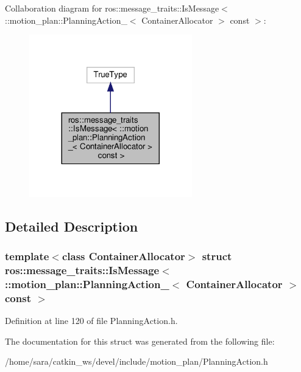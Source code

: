 Collaboration diagram for ros\+:\+:message\+\_\+traits\+:\+:Is\+Message$<$ \+:\+:motion\+\_\+plan\+:\+:Planning\+Action\+\_\+$<$ Container\+Allocator $>$ const $>$\+:
\nopagebreak
\begin{figure}[H]
\begin{center}
\leavevmode
\includegraphics[width=200pt]{structros_1_1message__traits_1_1IsMessage_3_01_1_1motion__plan_1_1PlanningAction___3_01Containerf6746e629c1b3909d4a386f97488adbc}
\end{center}
\end{figure}


\subsection{Detailed Description}
\subsubsection*{template$<$class Container\+Allocator$>$\newline
struct ros\+::message\+\_\+traits\+::\+Is\+Message$<$ \+::motion\+\_\+plan\+::\+Planning\+Action\+\_\+$<$ Container\+Allocator $>$ const $>$}



Definition at line 120 of file Planning\+Action.\+h.



The documentation for this struct was generated from the following file\+:\begin{DoxyCompactItemize}
\item 
/home/sara/catkin\+\_\+ws/devel/include/motion\+\_\+plan/Planning\+Action.\+h\end{DoxyCompactItemize}
